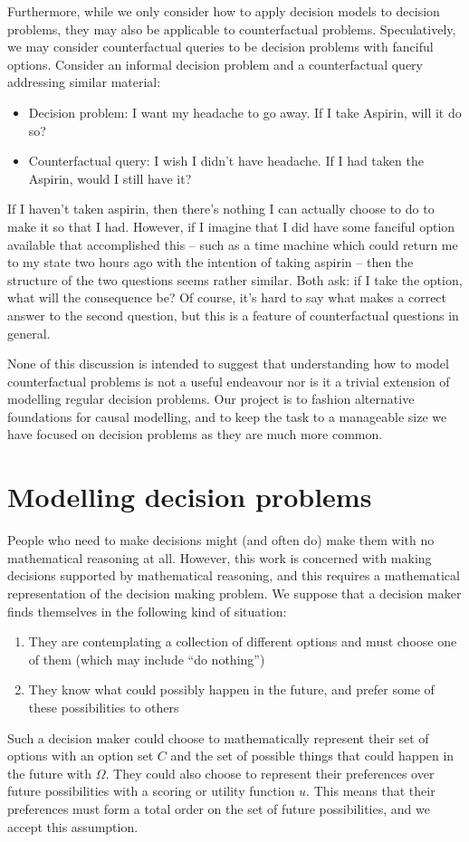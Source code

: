 Furthermore, while we only consider how to apply decision models to decision problems, they may also be applicable to counterfactual problems. Speculatively, we may consider counterfactual queries to be decision problems with fanciful options. Consider an informal decision problem and a counterfactual query addressing similar material:
\begin{itemize}
    \item Decision problem: I want my headache to go away. If I take Aspirin, will it do so?
    \item Counterfactual query: I wish I didn't have headache. If I had taken the Aspirin, would I still have it?
\end{itemize}
If I haven't taken aspirin, then there's nothing I can actually choose to do to make it so that I had. However, if I imagine that I did have some fanciful option available that accomplished this -- such as a time machine which could return me to my state two hours ago with the intention of taking aspirin -- then the structure of the two questions seems rather similar. Both ask: if I take the option, what will the consequence be? Of course, it's hard to say what makes a correct answer to the second question, but this is a feature of counterfactual questions in general.

None of this discussion is intended to suggest that understanding how to model counterfactual problems is not a useful endeavour nor is it a trivial extension of modelling regular decision problems. Our project is to fashion alternative foundations for causal modelling, and to keep the task to a manageable size we have focused on decision problems as they are much more common.

\section{Modelling decision problems}\label{sec:modelling_decision_problems}

People who need to make decisions might (and often do) make them with no mathematical reasoning at all. However, this work is concerned with making decisions supported by mathematical reasoning, and this requires a mathematical representation of the decision making problem. We suppose that a decision maker finds themselves in the following kind of situation:
\begin{enumerate}
    \item They are contemplating a collection of different options and must choose one of them (which may include ``do nothing'')
    \item They know what could possibly happen in the future, and prefer some of these possibilities to others
\end{enumerate}
Such a decision maker could choose to mathematically represent their set of options with an option set $C$ and the set of possible things that could happen in the future with $\Omega$. They could also choose to represent their preferences over future possibilities with a scoring or utility function $u$. This means that their preferences must form a total order on the set of future possibilities, and we accept this assumption.

